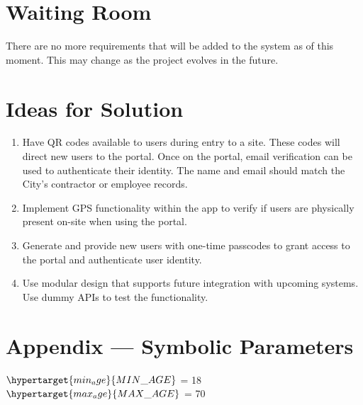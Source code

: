 \documentclass[12pt]{article}
\begin{document}
\section{Waiting Room}
There are no more requirements that will be added to the system as of this
moment. This may change as the project evolves in the future.

\section{Ideas for Solution}
\begin{enumerate}
  \item Have QR codes available to users during entry to a site.
    These codes will direct new users to the portal. Once on the
    portal, email verification can be used to authenticate their
    identity. The name and email should match the City's contractor
    or employee records.
  \item Implement GPS functionality within the app to verify if users
    are physically present on-site when using the portal.
  \item Generate and provide new users with one-time passcodes to
    grant access to the portal and authenticate user identity.
  \item Use modular design that supports future integration with
    upcoming systems. Use dummy APIs to test the functionality.
\end{enumerate}

\newpage{}
\section*{Appendix --- Symbolic Parameters}
$\hypertarget{min_age}{MIN\_AGE}$ = 18\\
$\hypertarget{max_age}{MAX\_AGE}$ = 70
\end{document}
